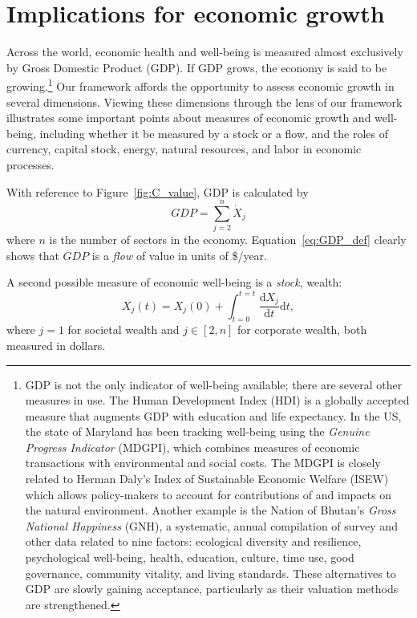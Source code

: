 \section{Implications for economic growth}
\label{sec:implications_for_development}

Across the world, economic health and well-being 
is measured almost exclusively 
by Gross Domestic Product (GDP). 
If GDP grows, the economy is said to be growing.\footnote{GDP 
	is not the only indicator of well-being available; 
	there are several other measures in use.
	The Human Development Index (HDI) is a globally accepted measure 
	that augments GDP with education and life expectancy.\cite{Malik:2013aa} 
	In the US, the state of Maryland has been tracking well-being 
	using the \emph{Genuine Progress Indicator} (MDGPI),
	which combines measures of economic transactions with 
	environmental and social costs.\cite{MDDNR:2013aa,Bagstad:2007aa} 
	The MDGPI is closely related to 
	Herman Daly's Index of Sustainable Economic Welfare (ISEW)
	which allows policy-makers to account for contributions of and impacts on 
	the natural environment.\cite{Daly:1994aa,MDDNR:2014ab}
	Another example is the Nation of Bhutan's \emph{Gross National Happiness} (GNH),
	a systematic, annual compilation 
		of survey and other data related to nine factors: 
		ecological diversity and resilience,
		psychological well-being,
		health,
		education, 
		culture, 
		time use, 
		good governance, 
		community vitality, and 
		living standards.\cite{Ura:2012aa,GNH:2014aa}
	These alternatives to GDP are slowly gaining acceptance, particularly
	as their valuation methods are strengthened.\cite{Lawn:2003aa}}
Our framework affords the opportunity to assess economic growth 
in several dimensions.
Viewing these dimensions through the lens of our framework 
illustrates some important points about measures 
of economic growth and well-being, including
whether it be measured by a stock or a flow,
and the roles of 
currency, 
capital stock, 
energy, 
natural resources, 
and labor in economic processes.

With reference to Figure~\ref{fig:C_value}, GDP is calculated by
%
\begin{equation} \label{eq:GDP_def}
	GDP
	= \sum\limits_{j=2}^{n} \dot{X}_{j}
\end{equation}
%
where $n$ is the number of sectors in the economy.
Equation~\ref{eq:GDP_def} clearly shows that 
$GDP$ is a \emph{flow} of value in units of \$/year.

A second possible measure of economic well-being is a \emph{stock}, 
wealth:
%
\begin{equation} \label{eq:Dev_Integral_Wealth}
	X_{j}(t) 
	= X_{j}(0) 
	+ \int_{t=0}^{t=t} \frac{\mathrm{d}X_{j}}{\mathrm{d}t}\mathrm{d}t,
\end{equation}
%
where $j=1$ for societal wealth 
and $j \in [2,n]$ for corporate wealth, both measured in dollars.

